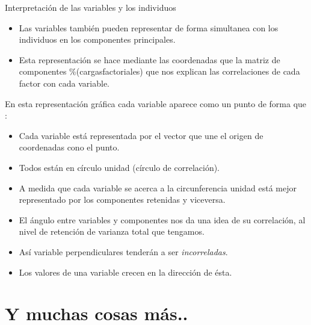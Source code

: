 \documentclass[
  spanish,
  ignorenonframetext,
]{beamer}
\providecommand{\tightlist}{%
  \setlength{\itemsep}{0pt}\setlength{\parskip}{0pt}}
\begin{document}
\begin{frame}{Interpretación de las variables y los individuos}
\protect\hypertarget{interpretaciuxf3n-de-las-variables-y-los-individuos-1}{}
\begin{itemize}
\item
  Las variables también pueden representar de forma simultanea con los
  individuos en los componentes principales.
\item
  Esta representación se hace mediante las coordenadas que la matriz de
  componentes \%(cargasfactoriales) que nos explican las correlaciones
  de cada factor con cada variable.
\end{itemize}

En esta representación gráfica cada variable aparece como un punto de
forma que :

\begin{itemize}
\tightlist
\item
  Cada variable está representada por el vector que une el origen de
  coordenadas cono el punto.
\item
  Todos están en círculo unidad (círculo de correlación).
\item
  A medida que cada variable se acerca a la circunferencia unidad está
  mejor representado por los componentes retenidas y viceversa.
\item
  El ángulo entre variables y componentes nos da una idea de su
  correlación, al nivel de retención de varianza total que tengamos.
\item
  Así variable perpendiculares tenderán a ser \emph{incorreladas}.
\item
  Los valores de una variable crecen en la dirección de ésta.
\end{itemize}
\end{frame}

\hypertarget{y-muchas-cosas-muxe1s..}{%
\section{Y muchas cosas más..}\label{y-muchas-cosas-muxe1s..}}
\end{document}
